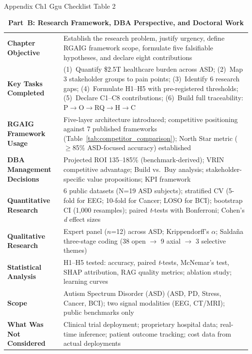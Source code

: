 \begin{table}[!htbp]
\caption{Appendix Ch1 Ggu Checklist Table 2}
\tablestripes
\caption*{\textbf{Part~B: Research Framework, DBA Perspective, and Doctoral Work}}
\tablefontsize
\begin{tabularx}{\textwidth}{@{} L L @{}}
\toprule
{} &  \\
\midrule
\textbf{Chapter Objective} & Establish the research problem, justify urgency, define RGAIG framework scope, formulate five falsifiable hypotheses, and declare eight contributions \\
\addlinespace
\textbf{Key Tasks Completed} & (1)~Quantify \$2.5T healthcare burden across ASD; (2)~Map 3 stakeholder groups to pain points; (3)~Identify 6 research gaps; (4)~Formulate H1--H5 with pre-registered thresholds; (5)~Declare C1--C8 contributions; (6)~Build full traceability: P$\to$O$\to$RQ$\to$H$\to$C \\
\addlinespace
\textbf{RGAIG Framework Usage} & Five-layer architecture introduced; competitive positioning against 7 published frameworks (Table~\ref{tab:competitor_comparison}); North Star metric ($\geq$85\% ASD-focused accuracy) established \\
\addlinespace
\textbf{DBA Management Decisions} & Projected ROI 135--185\% (benchmark-derived); VRIN competitive advantage; Build vs.\ Buy analysis; stakeholder-specific value propositions; KPI framework \\
\addlinespace
\textbf{Quantitative Research} & 6 public datasets (N=19 ASD subjects); stratified CV (5-fold for EEG; 10-fold for Cancer; LOSO for BCI); bootstrap CI (1,000 resamples); paired \textit{t}-tests with Bonferroni; Cohen's \textit{d} effect sizes \\
\addlinespace
\textbf{Qualitative Research} & Expert panel ($n$=12) across ASD; Krippendorff's $\alpha$; Salda\~{n}a three-stage coding (38 open $\to$ 9 axial $\to$ 3 selective themes) \\
\addlinespace
\textbf{Statistical Analysis} & H1--H5 tested: accuracy, paired \textit{t}-tests, McNemar's test, SHAP attribution, RAG quality metrics; ablation study; learning curves \\
\addlinespace
\textbf{Scope} & Autism Spectrum Disorder (ASD) (ASD, PD, Stress, Cancer, BCI); two signal modalities (EEG, CT/MRI); public benchmarks only \\
\addlinespace
\textbf{What Was Not Considered} & Clinical trial deployment; proprietary hospital data; real-time inference; patient outcome tracking; cost data from actual deployments \\

\end{tabularx}
\end{table}
